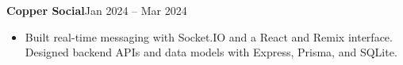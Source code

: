 \textbf{Copper Social}\hfill Jan 2024 -- Mar 2024\par
\begin{itemize}
  \item Built real-time messaging with Socket.IO and a React and Remix interface. Designed backend APIs and data models with Express, Prisma, and SQLite.
\end{itemize}
